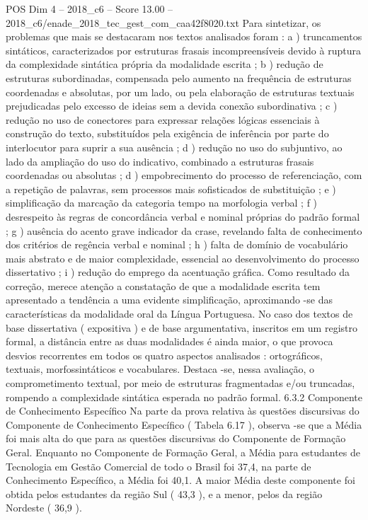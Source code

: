 \begin{textsample}{POS Dim 4 – 2018\_c6 – Score 13.00 – 2018\_c6/enade\_2018\_tec\_gest\_com\_caa42f8020.txt}
Para sintetizar, os problemas que mais se destacaram nos textos analisados foram : a ) truncamentos sintáticos, caracterizados por estruturas frasais incompreensíveis devido à ruptura da complexidade sintática própria da modalidade escrita ; b ) redução de estruturas subordinadas, compensada pelo aumento na frequência de estruturas coordenadas e absolutas, por um lado, ou pela elaboração de estruturas textuais prejudicadas pelo excesso de ideias sem a devida conexão subordinativa ; c ) redução no uso de conectores para expressar relações lógicas essenciais à construção do texto, substituídos pela exigência de inferência por parte do interlocutor para suprir a sua ausência ; d ) redução no uso do subjuntivo, ao lado da ampliação do uso do indicativo, combinado a estruturas frasais coordenadas ou absolutas ; d ) empobrecimento do processo de referenciação, com a repetição de palavras, sem processos mais sofisticados de substituição ; e ) simplificação da marcação da categoria tempo na morfologia verbal ; f ) desrespeito às regras de concordância verbal e nominal próprias do padrão formal ; g ) ausência do acento grave indicador da crase, revelando falta de conhecimento dos critérios de regência verbal e nominal ; h ) falta de domínio de vocabulário mais abstrato e de maior complexidade, essencial ao desenvolvimento do processo dissertativo ; i ) redução do emprego da acentuação gráfica.
Como resultado da correção, merece atenção a constatação de que a modalidade escrita tem apresentado a tendência a uma evidente simplificação, aproximando -se das características da modalidade oral da Língua Portuguesa.
No caso dos textos de base dissertativa ( expositiva ) e de base argumentativa, inscritos em um registro formal, a distância entre as duas modalidades é ainda maior, o que provoca desvios recorrentes em todos os quatro aspectos analisados : ortográficos, textuais, morfossintáticos e vocabulares.
Destaca -se, nessa avaliação, o comprometimento textual, por meio de estruturas fragmentadas e/ou truncadas, rompendo a complexidade sintática esperada no padrão formal. 6.3.2 Componente de Conhecimento Específico Na parte da prova relativa às questões discursivas do Componente de Conhecimento Específico ( Tabela 6.17 ), observa -se que a Média foi mais alta do que para as questões discursivas do Componente de Formação Geral.
Enquanto no Componente de Formação Geral, a Média para estudantes de Tecnologia em Gestão Comercial de todo o Brasil foi 37,4, na parte de Conhecimento Específico, a Média foi 40,1.
A maior Média deste componente foi obtida pelos estudantes da região Sul ( 43,3 ), e a menor, pelos da região Nordeste ( 36,9 ).

\end{textsample}
